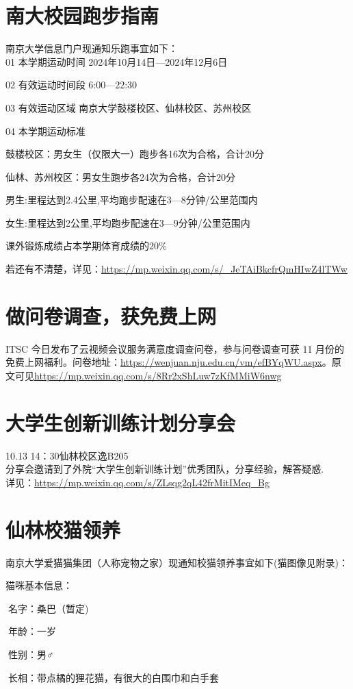 \documentclass[letterpaper, 12pt]{article}
\begin{document}
\begin{multicols}{2}
\section{南大校园跑步指南}
南京大学信息门户现通知乐跑事宜如下：\\
01  本学期运动时间  2024年10月14日—2024年12月6日

02  有效运动时间段  6:00—22:30

03  有效运动区域  南京大学鼓楼校区、仙林校区、苏州校区

04  本学期运动标准  

鼓楼校区：男女生（仅限大一）跑步各16次为合格，合计20分

仙林、苏州校区：男女生跑步各24次为合格，合计20分


男生:里程达到2.4公里,平均跑步配速在3—8分钟/公里范围内

女生:里程达到2公里,平均跑步配速在3—9分钟/公里范围内

课外锻炼成绩占本学期体育成绩的20\%

若还有不清楚，详见：\url{https://mp.weixin.qq.com/s/_JeTAiBkcfrQmHIwZ4lTWw}
\section{做问卷调查，获{\color{red}免费上网}}
ITSC 今日发布了云视频会议服务满意度调查问卷，参与问卷调查可获 11 月份的免费上网福利。问卷地址：\url{https://wenjuan.nju.edu.cn/vm/efBYqWU.aspx}。原文可见\url{https://mp.weixin.qq.com/s/8Rr2xShLuw7zKfMMiW6nwg}

\section{大学生创新训练计划分享会}
10.13 14：30仙林校区逸B205\\
分享会邀请到了外院“大学生创新训练计划”优秀团队，分享经验，解答疑惑.\\
详见：\url{https://mp.weixin.qq.com/s/ZLsqg2qL42frMitIMeq_Bg}
\section{仙林校猫领养}
南京大学爱猫猫集团（人称宠物之家）现通知校猫领养事宜如下(猫图像见附录)：

猫咪基本信息：

🐾名字：桑巴（暂定)

🍃年龄：一岁

🌸性别：男♂

🌼长相：带点橘的狸花猫，有很大的白围巾和白手套


\end{multicols}
\end{document}
